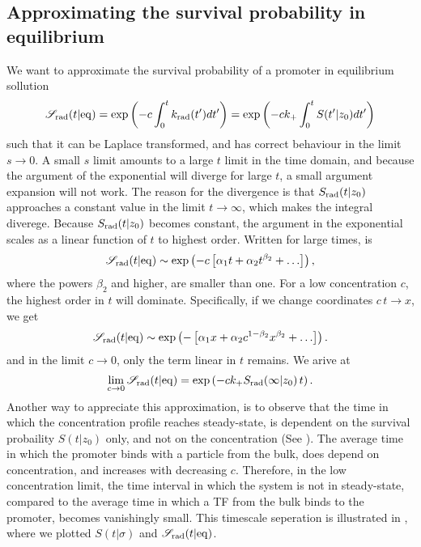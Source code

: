 \subsection{ Approximating the survival probability in equilibrium}
We want to approximate the survival probability of a promoter in equilibrium sollution
\begin{equation}
 \mathscr{S}_{\rm rad}(t|{\rm eq}) = {\rm exp}\left(-c \int_0^t k_{{\rm rad}}(t') dt'\right) = {\rm exp}\left(-c k_+ \int_0^t S(t'|z_0) dt'\right)
 \elabel{Seq_app}
\end{equation}
such that it can be Laplace transformed, and has correct behaviour in the limit $s\to0$. A small $s$ limit amounts to a large $t$ limit in the time domain, and because the argument of the exponential will diverge for large $t$, a small argument expansion will not work. The reason for the divergence is that $S_{\rm rad}(t|z_0)$ approaches a constant value in the limit $t\to\infty$, which makes the integral diverege. Because $S_{\rm rad}(t|z_0)$ becomes constant, the argument in the exponential scales as a linear function of $t$ to highest order. Written for large times,  is
\begin{equation}
 \mathscr{S}_{\rm rad}(t|{\rm eq}) \sim {\rm exp}\left(-c \left[ \alpha_1 t + \alpha_2 t^{\beta_2} + \ldots \right] \right),
\end{equation}
where the powers $\beta_2$ and higher, are smaller than one. For a low concentration $c$, the highest order in $t$ will dominate. Specifically, if we change coordinates $c\,t\to x$, we get
\begin{equation}
 \mathscr{S}_{\rm rad}(t|{\rm eq}) \sim {\rm exp}\left(-\left[ \alpha_1 x + \alpha_2 c^{1-\beta_2} x^{\beta_2} + \ldots \right] \right).
\end{equation}
and in the limit $c\to0$, only the term linear in $t$ remains. We arive at
\begin{equation}
 \lim_{c\to0} \mathscr{S}_{\rm rad}(t|{\rm eq}) = {\rm exp}\left(-c k_+ S_{\rm rad}(\infty|z_0) \, t \right).
 \elabel{Seq_app2}
\end{equation}
Another way to appreciate this approximation, is to observe that the time in which the concentration profile reaches steady-state, is dependent on the survival probaility $S(t|z_0)$ only, and not on the concentration (See ). The average time in which the promoter binds with a particle from the bulk, does depend on concentration, and increases with decreasing $c$. Therefore, in the low concentration limit, the time interval in which the system is not in steady-state, compared to the average time in which a TF from the bulk binds to the promoter, becomes vanishingly small. This timescale seperation is illustrated in , where we plotted $S(t|\sigma)$ and $\mathscr{S}_{\rm rad}(t|{\rm eq})$.

